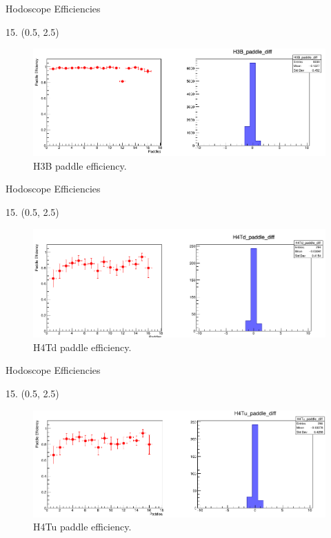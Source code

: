 \documentclass[12pt, xcolor={dvipsnames}, aspectratio = 169, sans,mathserif]{beamer}
\newenvironment{Pic}[2]
{
\begin{textblock}{#1} #2
\begin{figure}
}
{
\end{figure}
\end{textblock}
}
\begin{document}
\begin{frame}{Hodoscope Efficiencies}
\begin{Pic}{15.}{(0.5, 2.5)}
  \includegraphics[width=15.0cm]{imgs/H3B_paddle_diff.png}
  \caption{H3B paddle efficiency.}
\end{Pic}
\end{frame}

\begin{frame}{Hodoscope Efficiencies}
\begin{Pic}{15.}{(0.5, 2.5)}
  \includegraphics[width=15.0cm]{imgs/H4Td_paddle_diff.png}
  \caption{H4Td paddle efficiency.}
\end{Pic}
\end{frame}

\begin{frame}{Hodoscope Efficiencies}
\begin{Pic}{15.}{(0.5, 2.5)}
  \includegraphics[width=15.0cm]{imgs/H4Tu_paddle_diff.png}
  \caption{H4Tu paddle efficiency.}
\end{Pic}
\end{frame}
\end{document}
